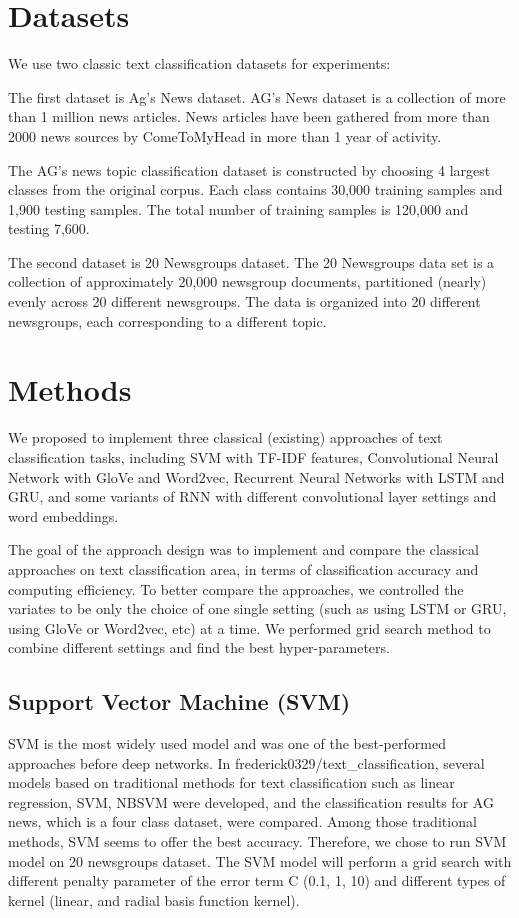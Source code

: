 \documentclass{article}
\begin{document}
\section{Datasets}

We use two classic text classification datasets for experiments:

The first dataset is Ag's News dataset. AG's News dataset is a collection of more than 1 million news articles. News articles have been gathered from more than 2000  news sources by ComeToMyHead in more than 1 year of activity.

The AG's news topic classification dataset is constructed by choosing 4 largest classes from the original corpus. Each class contains 30,000 training samples and 1,900 testing samples. The total number of training samples is 120,000 and testing 7,600.

The second dataset is 20 Newsgroups dataset. The 20 Newsgroups data set is a collection of approximately 20,000 newsgroup documents, partitioned (nearly) evenly across 20 different newsgroups. The data is organized into 20 different newsgroups, each corresponding to a different topic.


\section{Methods}
We proposed to implement three classical (existing) approaches of text classification tasks, including SVM with TF-IDF features, Convolutional Neural Network with GloVe and Word2vec, Recurrent Neural Networks with LSTM and GRU, and some variants of RNN with different convolutional layer settings and word embeddings. 

The goal of the approach design was to implement and compare the classical approaches on text classification area, in terms of classification accuracy and computing efficiency. To better compare the approaches, we controlled the variates to be only the choice of one single setting (such as using LSTM or GRU, using GloVe or Word2vec, etc) at a time. We performed grid search method to combine different settings and find the best hyper-parameters.



\subsection{Support Vector Machine (SVM)}
 SVM is the most widely used model and was one of the best-performed approaches before deep networks. In frederick0329/text\_classification, several models based on traditional methods for text classification such as linear regression, SVM, NBSVM  were developed, and the classification results for AG news, which is a four class dataset, were compared. Among those traditional methods, SVM seems to offer the best accuracy. Therefore, we chose to run SVM model on 20 newsgroups dataset.  The SVM model will perform a grid search with different penalty parameter of the error term C (0.1, 1, 10) and different types of kernel (linear, and radial basis function kernel). 
\end{document}
